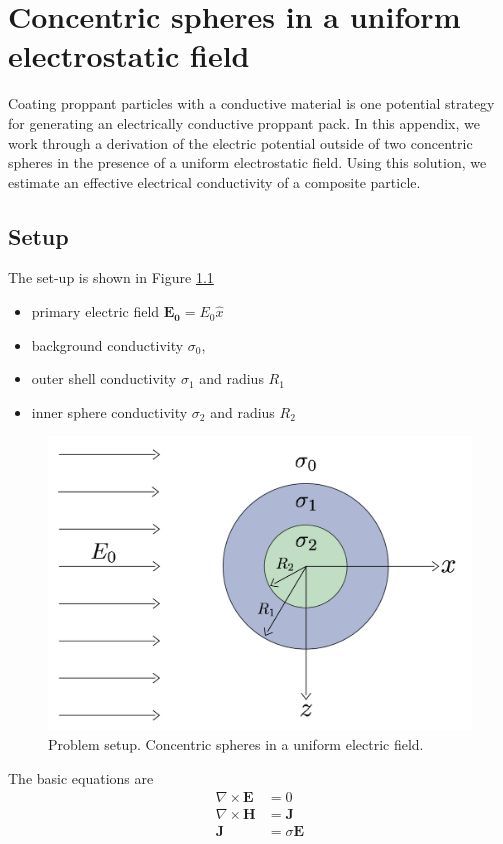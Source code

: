 \chapter{Concentric spheres in a uniform electrostatic field}
\label{app:concentric_spheres}
Coating proppant particles with a conductive material is one potential strategy for generating an electrically conductive proppant pack. In this appendix, we work through a derivation of the electric potential outside of two concentric spheres in the presence of a uniform electrostatic field. Using this solution, we estimate an effective electrical conductivity of a composite particle.

\section{Setup}
The set-up is shown in Figure \ref{fig:concentric_sphere_setup}
\begin{itemize}
    \item primary electric field $\mathbf{E_0} = E_0 \hat{x}$
    \item background conductivity $\sigma_0$,
    \item outer shell conductivity $\sigma_1$ and radius $R_1$
    \item inner sphere conductivity $\sigma_2$ and radius $R_2$
\end{itemize}

\begin{figure}[htb!]
    \centering
    \includegraphics[width=0.6\linewidth]{figures/appendix1/setup}
        \caption{Problem setup. Concentric spheres in a uniform electric field.}
        \label{fig:concentric_sphere_setup}
\end{figure}

The basic equations are
\begin{align}
    \nabla \times \mathbf{E} &= 0  \label{eq:curlE}\\
    \nabla \times \mathbf{H} &= \mathbf{J}\label{eq:curlH}\\
    \mathbf{J} &= \sigma \mathbf{E} \label{eq:JsigE}
\end{align}

